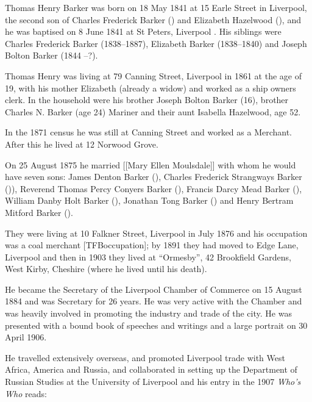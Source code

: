 
Thomas Henry Barker was born on 18 May 1841\cite{THBbirth} at 15 Earle Street in Liverpool,\cite{THBplantagenets} the second son of Charles Frederick Barker () and Elizabeth Hazelwood (), and he was baptised on 8 June 1841 at St Peters, Liverpool \cite{THBbaptism}.  His siblings were Charles Frederick Barker (1838--1887),  Elizabeth Barker (1838--1840) and Joseph Bolton Barker (1844 --?). 

Thomas Henry was living at 79 Canning Street, Liverpool in 1861 at the age of 19, with his mother Elizabeth (already a widow) and worked as a ship owners clerk.  In the household were his brother Joseph Bolton Barker (16), brother Charles N. Barker (age 24) Mariner and their aunt Isabella Hazelwood, age 52.

In the 1871 census he was still at Canning Street and worked as a Merchant. After this he lived at 12 Norwood Grove\cite{THBcensus}.


On 25 August 1875 he married [[Mary Ellen Moulsdale]]\cite{THBmarriage} with whom he would have seven sons:\cite{THBplantagenets}  James Denton Barker (), Charles Frederick Strangways Barker ()), Reverend Thomas Percy Conyers Barker (), Francis Darcy Mead Barker (), William Danby Holt Barker (), 
Jonathan Tong Barker () and Henry Bertram Mitford Barker ().
 
They were living at 10 Falkner Street, Liverpool in July 1876 and his occupation was a coal merchant [TFBoccupation];  by 1891 they had moved to Edge Lane, Liverpool\cite{THBresidence} and then in 1903 they lived at ``Ormesby'', 42 Brookfield Gardens, West Kirby, Cheshire (where he lived until his death).\cite{THBdeathcert}

He became the Secretary of the Liverpool Chamber of Commerce on 15 August 1884 and was Secretary for 26 years.  He was very active with the Chamber and was heavily involved in promoting the industry and trade of the city.  He was presented with a bound book of speeches and writings and a large portrait on 30 April 1906.

He travelled extensively overseas, and promoted Liverpool trade with West Africa, America and Russia, and collaborated in setting up the Department of Russian Studies at the University of Liverpool and his entry in  the 1907 \emph{Who's Who} reads:

